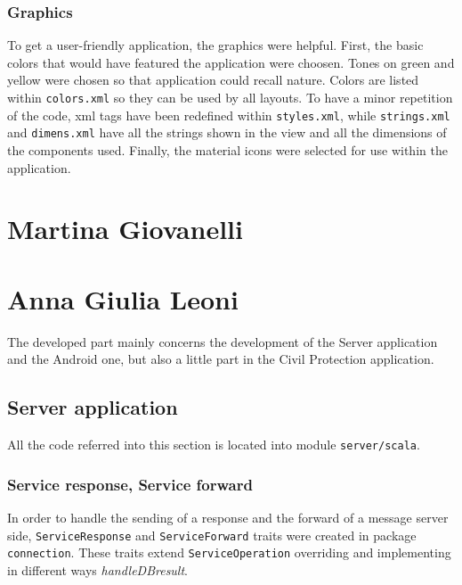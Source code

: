 \documentclass[a4paper,12pt]{report}
\begin{document}
\subsubsection{Graphics}
To get a user-friendly application, the graphics were helpful. First, the basic colors that would have featured the application were choosen. Tones on green and yellow were chosen so that application could recall nature. Colors are listed within \texttt{colors.xml} so they can be used by all layouts. To have a minor repetition of the code, xml tags have been redefined within \texttt{styles.xml}, while \texttt{strings.xml} and \texttt{dimens.xml} have all the strings shown in the view and all the dimensions of the components used. Finally, the material icons were selected for use within the application.

\section{Martina Giovanelli}
\section{Anna Giulia Leoni}

The developed part mainly concerns the development of the Server application and the Android one, but also  a little part in the Civil Protection application.

\subsection{Server application}

All the code referred into this section is located into module \texttt{server/scala}.

\subsubsection{Service response, Service forward}
In order to handle the sending of a response and the forward of a message server side, \texttt{ServiceResponse} and \texttt{ServiceForward} traits were created in package \texttt{connection}. These traits extend \texttt{ServiceOperation} overriding and implementing in different ways \textit{handleDBresult}. 
\end{document}
